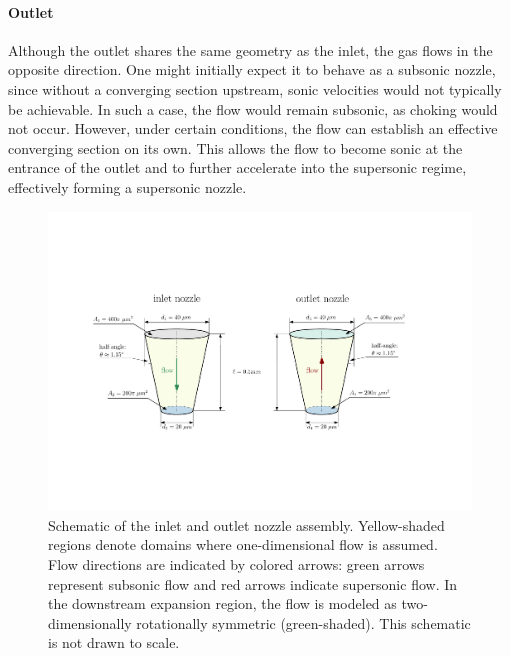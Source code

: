 	\paragraph{Outlet}
		Although the outlet shares the same geometry as the inlet, the gas flows in the opposite direction.
		One might initially expect it to behave as a subsonic nozzle, since without a converging section upstream, sonic velocities would not typically be achievable.
		In such a case, the flow would remain subsonic, as choking would not occur.
		However, under certain conditions, the flow can establish an effective converging section on its own.
		This allows the flow to become sonic at the entrance of the outlet and to further accelerate into the supersonic regime, effectively forming a supersonic nozzle.
		\cite{jousten_handbook_2016}
		\begin{figure}[H]
		    \centering
		    \includegraphics[width=\textwidth]{src/03_analytical-work/fig_nozzle-geometries.pdf}
		    \caption{
		        Schematic of the inlet and outlet nozzle assembly.
		        Yellow-shaded regions denote domains where one-dimensional flow is assumed.
		        Flow directions are indicated by colored arrows: green arrows represent subsonic flow and red arrows indicate supersonic flow.
		        In the downstream expansion region, the flow is modeled as two-dimensionally rotationally symmetric (green-shaded).
		        This schematic is not drawn to scale.
		    }
		    \label{fig:geometry-nozzles}
		\end{figure}

